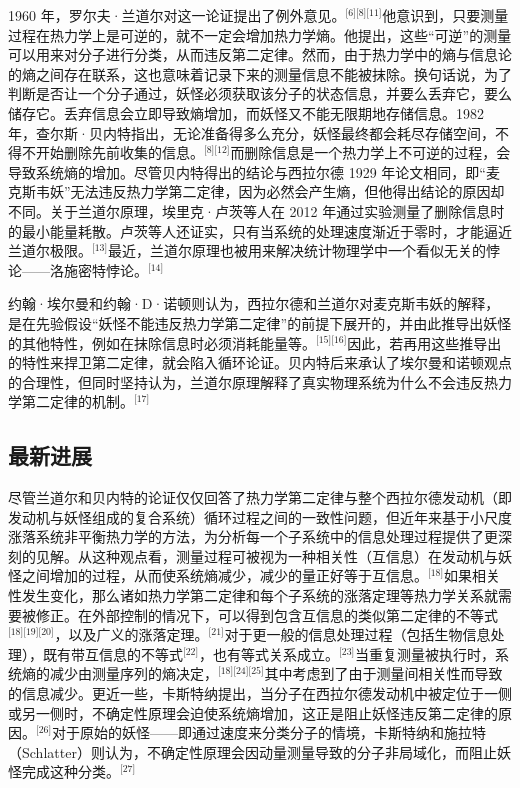 1960 年，罗尔夫·兰道尔对这一论证提出了例外意见。\(^\text{[6][8][11]}\)他意识到，只要测量过程在热力学上是可逆的，就不一定会增加热力学熵。他提出，这些“可逆”的测量可以用来对分子进行分类，从而违反第二定律。然而，由于热力学中的熵与信息论的熵之间存在联系，这也意味着记录下来的测量信息不能被抹除。换句话说，为了判断是否让一个分子通过，妖怪必须获取该分子的状态信息，并要么丢弃它，要么储存它。丢弃信息会立即导致熵增加，而妖怪又不能无限期地存储信息。1982 年，查尔斯·贝内特指出，无论准备得多么充分，妖怪最终都会耗尽存储空间，不得不开始删除先前收集的信息。\(^\text{[8][12]}\)而删除信息是一个热力学上不可逆的过程，会导致系统熵的增加。尽管贝内特得出的结论与西拉尔德 1929 年论文相同，即“麦克斯韦妖”无法违反热力学第二定律，因为必然会产生熵，但他得出结论的原因却不同。关于兰道尔原理，埃里克·卢茨等人在 2012 年通过实验测量了删除信息时的最小能量耗散。卢茨等人还证实，只有当系统的处理速度渐近于零时，才能逼近兰道尔极限。\(^\text{[13]}\)最近，兰道尔原理也被用来解决统计物理学中一个看似无关的悖论——洛施密特悖论。\(^\text{[14]}\)

约翰·埃尔曼和约翰·D·诺顿则认为，西拉尔德和兰道尔对麦克斯韦妖的解释，是在先验假设“妖怪不能违反热力学第二定律”的前提下展开的，并由此推导出妖怪的其他特性，例如在抹除信息时必须消耗能量等。\(^\text{[15][16]}\)因此，若再用这些推导出的特性来捍卫第二定律，就会陷入循环论证。贝内特后来承认了埃尔曼和诺顿观点的合理性，但同时坚持认为，兰道尔原理解释了真实物理系统为什么不会违反热力学第二定律的机制。\(^\text{[17]}\)
\subsection{最新进展}
尽管兰道尔和贝内特的论证仅仅回答了热力学第二定律与整个西拉尔德发动机（即发动机与妖怪组成的复合系统）循环过程之间的一致性问题，但近年来基于小尺度涨落系统非平衡热力学的方法，为分析每一个子系统中的信息处理过程提供了更深刻的见解。从这种观点看，测量过程可被视为一种相关性（互信息）在发动机与妖怪之间增加的过程，从而使系统熵减少，减少的量正好等于互信息。\(^\text{[18]}\)如果相关性发生变化，那么诸如热力学第二定律和每个子系统的涨落定理等热力学关系就需要被修正。在外部控制的情况下，可以得到包含互信息的类似第二定律的不等式\(^\text{[18][19][20]}\)，以及广义的涨落定理。\(^\text{[21]}\)对于更一般的信息处理过程（包括生物信息处理），既有带互信息的不等式\(^\text{[22]}\)，也有等式关系成立。\(^\text{[23]}\)当重复测量被执行时，系统熵的减少由测量序列的熵决定，\(^\text{[18][24][25]}\)其中考虑到了由于测量间相关性而导致的信息减少。更近一些，卡斯特纳提出，当分子在西拉尔德发动机中被定位于一侧或另一侧时，不确定性原理会迫使系统熵增加，这正是阻止妖怪违反第二定律的原因。\(^\text{[26]}\)对于原始的妖怪——即通过速度来分类分子的情境，卡斯特纳和施拉特（Schlatter）则认为，不确定性原理会因动量测量导致的分子非局域化，而阻止妖怪完成这种分类。\(^\text{[27]}\)
